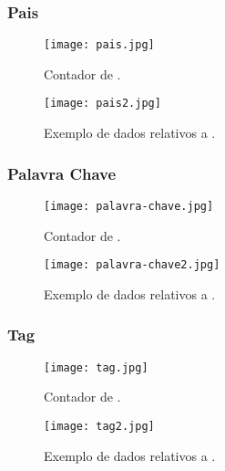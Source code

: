 \subsubsection{Pais}

\begin{figure}[H]
  \centering
  \begin{minipage}[b]{0.25\textwidth}
      \centering
      \texttt{[image: pais.jpg]}
      \caption{Contador de .}
  \end{minipage}
  \hspace{0.05\textwidth}
  \begin{minipage}[b]{0.6\textwidth}
      \centering
      \texttt{[image: pais2.jpg]}
      \caption{Exemplo de dados relativos a .}
  \end{minipage}
\end{figure}

\subsubsection{Palavra Chave}

\begin{figure}[H]
  \centering
  \begin{minipage}[b]{0.25\textwidth}
      \centering
      \texttt{[image: palavra-chave.jpg]}
      \caption{Contador de .}
  \end{minipage}
  \hspace{0.05\textwidth}
  \begin{minipage}[b]{0.6\textwidth}
      \centering
      \texttt{[image: palavra-chave2.jpg]}
      \caption{Exemplo de dados relativos a .}
  \end{minipage}
\end{figure}

\subsubsection{Tag}

\begin{figure}[H]
  \centering
  \begin{minipage}[b]{0.25\textwidth}
      \centering
      \texttt{[image: tag.jpg]}
      \caption{Contador de .}
  \end{minipage}
  \hspace{0.05\textwidth}
  \begin{minipage}[b]{0.6\textwidth}
      \centering
      \texttt{[image: tag2.jpg]}
      \caption{Exemplo de dados relativos a .}
  \end{minipage}
\end{figure}

